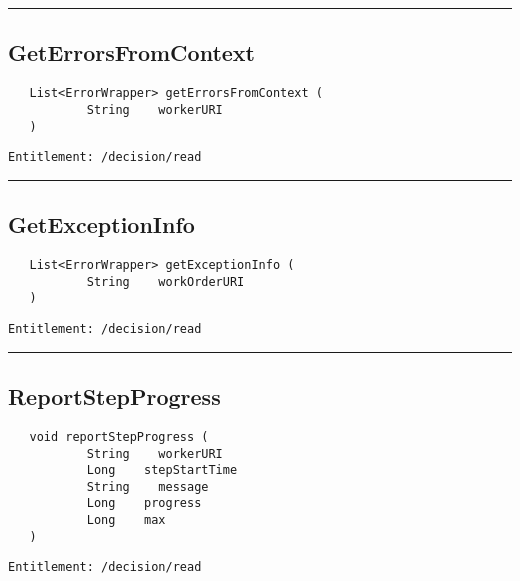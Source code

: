 \rule{12cm}{2pt}
\subsection{GetErrorsFromContext}
\label{Api:GetErrorsFromContext}
\begin{Verbatim}
   List<ErrorWrapper> getErrorsFromContext (
           String    workerURI
   )
\end{Verbatim}
\begin{Verbatim}[formatcom=\color{Maroon}]
  Entitlement: /decision/read
\end{Verbatim}



\rule{12cm}{2pt}
\subsection{GetExceptionInfo}
\label{Api:GetExceptionInfo}
\begin{Verbatim}
   List<ErrorWrapper> getExceptionInfo (
           String    workOrderURI
   )
\end{Verbatim}
\begin{Verbatim}[formatcom=\color{Maroon}]
  Entitlement: /decision/read
\end{Verbatim}



\rule{12cm}{2pt}
\subsection{ReportStepProgress}
\label{Api:ReportStepProgress}
\begin{Verbatim}
   void reportStepProgress (
           String    workerURI
           Long    stepStartTime
           String    message
           Long    progress
           Long    max
   )
\end{Verbatim}
\begin{Verbatim}[formatcom=\color{Maroon}]
  Entitlement: /decision/read
\end{Verbatim}



